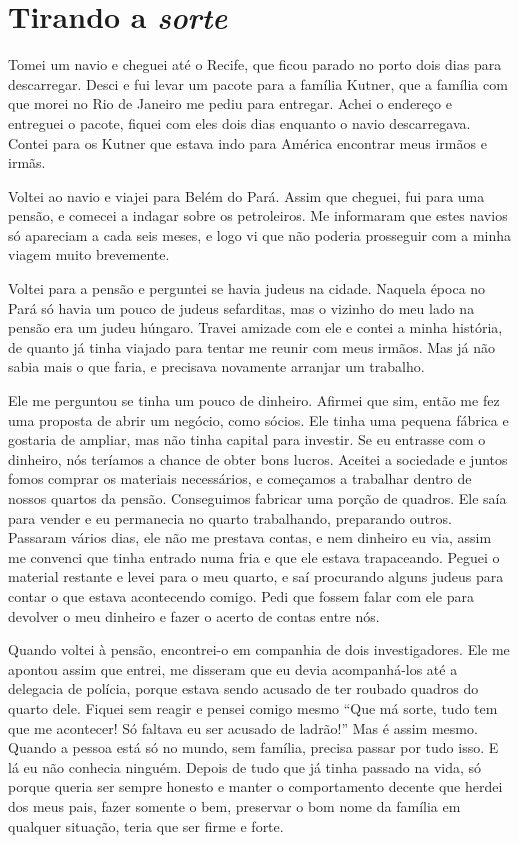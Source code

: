 \chapter{Tirando a \textit{sorte}}

Tomei um navio e cheguei até o Recife, que ficou parado no porto
dois dias para descarregar. Desci e fui levar um pacote para a família
Kutner, que a família
com que morei no Rio de Janeiro me pediu para entregar. 
Achei o endereço e entreguei o pacote, fiquei com eles dois
dias enquanto o navio descarregava. Contei para os Kutner que estava
indo para América encontrar meus irmãos e irmãs.

Voltei ao navio e viajei para Belém do Pará. Assim que cheguei, fui para
uma pensão, e comecei a indagar sobre os petroleiros. Me
informaram que estes navios só apareciam a cada seis meses, e logo vi que
não poderia prosseguir com a minha viagem muito brevemente.

Voltei para a pensão e perguntei se havia judeus na cidade. Naquela
época no Pará só havia um pouco de judeus sefarditas, mas o vizinho do meu lado na pensão 
era um judeu húngaro. Travei amizade com ele e
contei a minha história, de quanto já tinha viajado para tentar me
reunir com meus irmãos. Mas já não sabia mais o que faria, e precisava novamente
arranjar um trabalho.

Ele me perguntou se tinha um pouco de dinheiro. Afirmei que sim,
então me fez uma proposta de abrir um negócio, como sócios. Ele tinha uma
pequena fábrica e gostaria de ampliar, mas não tinha capital para
investir. Se eu entrasse com o dinheiro, nós teríamos a chance de obter
bons lucros. Aceitei a sociedade e juntos fomos comprar os materiais
necessários, e começamos a trabalhar dentro de nossos quartos da pensão.
Conseguimos fabricar uma porção de quadros. Ele saía para vender e eu
permanecia no quarto trabalhando, preparando outros. Passaram vários
dias, ele não me prestava contas, e nem dinheiro eu via, assim me
convenci que tinha entrado numa fria e que ele estava trapaceando. Peguei
o material restante e levei para o meu quarto, e saí procurando alguns
judeus para contar o que estava acontecendo comigo. Pedi que
fossem falar com ele para devolver o meu dinheiro e fazer o acerto de
contas entre nós.

Quando voltei à pensão, encontrei-o em companhia de dois investigadores. 
Ele me apontou assim que entrei, me disseram que eu devia
acompanhá-los até a delegacia de polícia, porque estava sendo acusado de
ter roubado quadros do quarto dele. Fiquei sem reagir e pensei comigo
mesmo ``Que má sorte, tudo tem que me acontecer! Só faltava eu ser
acusado de ladrão!'' Mas é assim mesmo. Quando a pessoa está só no
mundo, sem família, precisa passar por tudo isso. E lá eu não conhecia
ninguém. Depois de tudo que já tinha passado na vida, só porque queria
ser sempre honesto e manter o comportamento decente que herdei dos meus
pais, fazer somente o bem, preservar o bom nome da família em
qualquer situação, teria que ser firme e forte.

